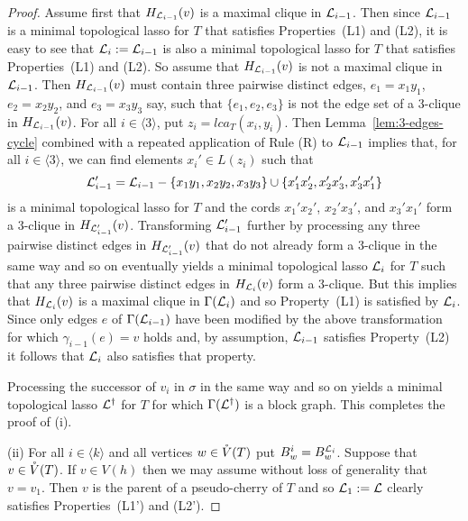 \begin{proof}
Assume first that $H_{{\mathcal L}_{i-1}}(v)$ is a maximal clique in 
${\mathcal L}_{i-1}$. Then since 
${\mathcal L}_{i-1}$ is a minimal topological lasso for $T$ that
 satisfies Properties~(L1) and (L2), it is easy to see that
${\mathcal L}_{i}:={\mathcal L}_{i-1}$ is also a minimal topological lasso for $T$ that
satisfies Properties~(L1) and (L2). 
So assume that 
$H_{{\mathcal L}_{i-1}}(v)$ is not a maximal clique in ${\mathcal L}_{i-1}$.
Then $H_{{\mathcal L}_{i-1}}(v)$ must contain three pairwise distinct edges, 
$e_1=x_1y_1$, $e_2=x_2y_2$, and $e_3=x_3y_3$ say, such that 
$\{e_1, e_2,e_3\}$ is not the edge set of a $3$-clique in $H_{{\mathcal L}_{i-1}}(v)$.
For all $i\in\langle 3\rangle $, put $z_i=lca_T(x_i,y_i)$.  
Then Lemma~\ref{lem:3-edges-cycle} combined with a repeated
application of Rule (R) to ${\mathcal L}_{i-1}$
implies that, for all $i\in\langle 3\rangle$, we can 
find elements $x_i'\in L(z_i)$
such that 
$$
{\mathcal L}_{i-1}'={\mathcal L}_{i-1}-\{x_1y_1,x_2y_2,x_3y_3\}\cup 
\{x_1'x_2', x_2'x_3',x_3'x_1'\}
$$
is a minimal topological lasso for $T$ and the cords
$x_1'x_2'$, $x_2'x_3'$, and $x_3'x_1'$ form a $3$-clique 
in $H_{{\mathcal L}_{i-1}'}(v)$.
Transforming ${\mathcal L}_{i-1}'$ further by processing any 
three pairwise distinct edges in $H_{{\mathcal L}_{i-1}'}(v)$ that 
do not already form a $3$-clique in the same way 
and so on eventually yields a minimal topological lasso 
${\mathcal L}_{i}$ for $T$ such that any three pairwise distinct edges in
 $H_{{\mathcal L}_{i}}(v)$ form a $3$-clique. But this implies that $H_{{\mathcal L}_{i}}(v)$ is
a maximal clique in $\Gamma({\mathcal L}_{i})$
and so Property~(L1) is satisfied by ${\mathcal L}_i$. Since only edges 
$e$ of $\Gamma({\mathcal L}_{i-1})$ 
have been modified by the above transformation 
for which $\gamma_{i-1}(e)=v$ holds and, by assumption,  ${\mathcal L}_{i-1}$
satisfies Property~(L2) it follows that
${\mathcal L}_{i}$ also satisfies that property. 

Processing the successor of $v_i$ in $\sigma$ in the same way and so
on yields a minimal topological lasso 
${\mathcal L}^{\dagger}$ for $T$ for which $\Gamma({\mathcal L}^{\dagger})$ is a 
block graph. This completes the proof of (i).


(ii) For all $i\in \langle k\rangle$
and all vertices $w\in \mathring{V}(T)$ put $B^i_w=B^{{\mathcal L}_i}_w$.
Suppose that $v\in \mathring{V}(T)$. If $v\in V(h)$ then
we may assume without loss of generality
that $v=v_1$. Then $v$ is the parent of a pseudo-cherry of $T$ 
and so ${\mathcal L}_1:={\mathcal L}$ clearly satisfies Properties~(L1')
and (L2').


\end{proof}
